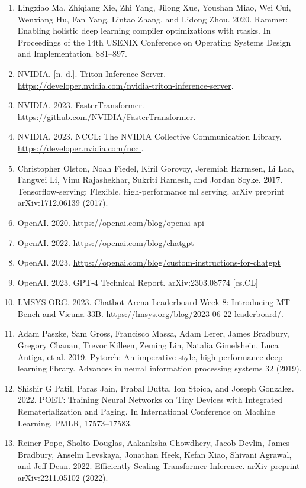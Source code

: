 \documentclass[11pt,UTF8,fontset=fandol]{ctexart}
\begin{document}
\begin{enumerate}[leftmargin=2.2em,labelsep=0.6em,itemsep=0.25em]
\item Lingxiao Ma, Zhiqiang Xie, Zhi Yang, Jilong Xue, Youshan Miao, Wei Cui, Wenxiang Hu, Fan Yang, Lintao Zhang, and Lidong Zhou. 2020. Rammer: Enabling holistic deep learning compiler optimizations with rtasks. In Proceedings of the 14th USENIX Conference on Operating Systems Design and Implementation. 881--897.
\item NVIDIA. [n. d.]. Triton Inference Server. \url{https://developer.nvidia.com/nvidia-triton-inference-server}.
\item NVIDIA. 2023. FasterTransformer. \url{https://github.com/NVIDIA/FasterTransformer}.
\item NVIDIA. 2023. NCCL: The NVIDIA Collective Communication Library. \url{https://developer.nvidia.com/nccl}.
\item Christopher Olston, Noah Fiedel, Kiril Gorovoy, Jeremiah Harmsen, Li Lao, Fangwei Li, Vinu Rajashekhar, Sukriti Ramesh, and Jordan Soyke. 2017. Tensorflow-serving: Flexible, high-performance ml serving. arXiv preprint arXiv:1712.06139 (2017).
\item OpenAI. 2020. \url{https://openai.com/blog/openai-api}
\item OpenAI. 2022. \url{https://openai.com/blog/chatgpt}
\item OpenAI. 2023. \url{https://openai.com/blog/custom-instructions-for-chatgpt}
\item OpenAI. 2023. GPT-4 Technical Report. arXiv:2303.08774 [cs.CL]
\item LMSYS ORG. 2023. Chatbot Arena Leaderboard Week 8: Introducing MT-Bench and Vicuna-33B. \url{https://lmsys.org/blog/2023-06-22-leaderboard/}.
\item Adam Paszke, Sam Gross, Francisco Massa, Adam Lerer, James Bradbury, Gregory Chanan, Trevor Killeen, Zeming Lin, Natalia Gimelshein, Luca Antiga, et al. 2019. Pytorch: An imperative style, high-performance deep learning library. Advances in neural information processing systems 32 (2019).
\item Shishir G Patil, Paras Jain, Prabal Dutta, Ion Stoica, and Joseph Gonzalez. 2022. POET: Training Neural Networks on Tiny Devices with Integrated Rematerialization and Paging. In International Conference on Machine Learning. PMLR, 17573--17583.
\item Reiner Pope, Sholto Douglas, Aakanksha Chowdhery, Jacob Devlin, James Bradbury, Anselm Levskaya, Jonathan Heek, Kefan Xiao, Shivani Agrawal, and Jeff Dean. 2022. Efficiently Scaling Transformer Inference. arXiv preprint arXiv:2211.05102 (2022).

\end{enumerate}
\end{document}
